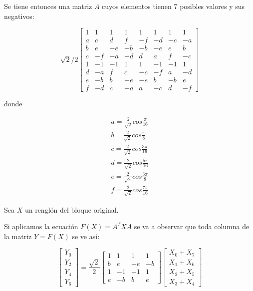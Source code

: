{Se tiene entonces una matriz $A$ cuyos elementos tienen 7 posibles valores y sus negativos:

\begin{equation}
    \label{eq:dct-matrix-simple}
    \sqrt{2}/2
    \begin{bmatrix}
        1 & 1 & 1 & 1 & 1 & 1 & 1 & 1  \\
        a & c & d & f & -f & -d & -c & -a \\
        b & e & -e & -b & -b & -e & e & b \\
        c & -f & -a & -d & d & a & f & -c \\
        1 & -1 & -1 & 1 & 1 & -1 & -1 & 1\\
        d & -a & f & c & -c & -f & a & -d \\
        e & -b & b & -e & -e & b & -b & e \\
        f & -d & c & -a & a & -c & d & -f
    \end{bmatrix}
\end{equation}

donde

\begin{eqnarray*}
    a = \frac{2}{\sqrt{2}}cos\frac{\pi}{16}\\
    b = \frac{2}{\sqrt{2}}cos\frac{\pi}{8}\\
    c = \frac{2}{\sqrt{2}}cos\frac{3\pi}{16}\\
    d = \frac{2}{\sqrt{2}}cos\frac{5\pi}{16}\\
    e = \frac{2}{\sqrt{2}}cos\frac{3\pi}{8}\\
    f = \frac{2}{\sqrt{2}}cos\frac{7\pi}{16}
\end{eqnarray*}

Sea $X$ un renglón del bloque original.

Si aplicamos la ecuación $F(X) = A^{T}XA$ se va a observar que toda columna de la matriz $Y = F(X)$ se ve así:


\begin{equation}
    \label{eq:dct-row}
    \begin{bmatrix}
        Y_0 \\
        Y_2 \\
        Y_4 \\
        Y_6
    \end{bmatrix}
    = \frac{\sqrt{2}}{2} \begin{bmatrix}
        1 & 1 & 1 & 1  \\
        b & e & -e & -b \\
        1 & -1 & -1 & 1  \\
        e & -b & b & e
        \end {bmatrix} \begin {bmatrix}
        X_0 + X_7 \\
        X_1 + X_6 \\
        X_2 + X_5 \\
        X_3 + X_4
        \end {bmatrix}
\end{equation}

}
